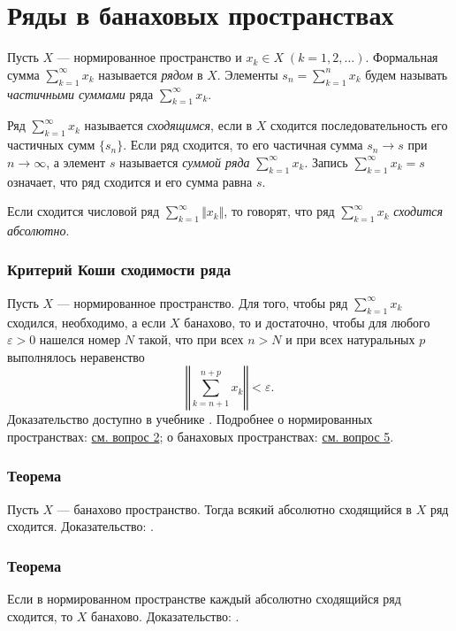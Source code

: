 \section{Ряды в банаховых пространствах}
Пусть $X$ --- нормированное пространство и $x_k \in X\;(k = 1, 2, \ldots)$. Формальная сумма $\displaystyle \sum_{k=1}^{\infty}x_k$ называется \textit{рядом} в $X$. Элементы $\displaystyle s_n = \sum_{k=1}^{n}x_k$ будем называть \textit{частичными суммами} ряда $\displaystyle \sum_{k=1}^{\infty}x_k$.

Ряд $\displaystyle \sum_{k=1}^{\infty}x_k$ называется \textit{сходящимся}, если в $X$ сходится последовательность его частичных сумм $\{s_n\}$. Если ряд сходится, то его частичная сумма $s_n \rightarrow s$ при $n \rightarrow \infty$, а элемент $s$ называется \textit{суммой ряда} $\displaystyle \sum_{k=1}^{\infty}x_k$. Запись $\displaystyle \sum_{k=1}^{\infty}x_k = s$ означает, что ряд сходится и его сумма равна $s$.

Если сходится числовой ряд $\displaystyle \sum_{k=1}^{\infty}\Vert x_k \Vert$, то говорят, что ряд $\displaystyle \sum_{k=1}^{\infty}x_k$ \textit{сходится абсолютно}.

\subsubsection*{Критерий Коши сходимости ряда}
Пусть $X$ --- нормированное пространство. Для того, чтобы ряд $\displaystyle \sum_{k=1}^{\infty}x_k$ сходился, необходимо, а если $X$ банахово, то и достаточно, чтобы для любого $\varepsilon > 0$ нашелся номер $N$ такой, что при всех $n > N$ и при всех натуральных $p$ выполнялось неравенство
$$\left\Vert \sum_{k=n+1}^{n+p}x_k \right\Vert < \varepsilon.$$
Доказательство доступно в учебнике \cite[с.~46]{trenogin}. Подробнее о нормированных пространствах: \hyperref[sec:q-2]{см. вопрос 2}; о банаховых пространствах: \hyperref[sec:q-5]{см. вопрос 5}.

\subsubsection*{Теорема}
Пусть $X$ --- банахово пространство. Тогда всякий абсолютно сходящийся в $X$ ряд сходится. Доказательство: \cite[с.~47]{trenogin}.

\subsubsection*{Теорема}
Если в нормированном пространстве каждый абсолютно сходящийся ряд сходится, то $X$ банахово. Доказательство: \cite[с.~47]{trenogin}.